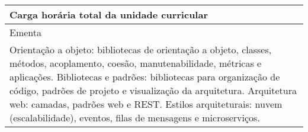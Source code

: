 \begin{quadro}[h!]
\begin{tabular}{|p{3cm} p{2cm} p{3cm} p{2cm} p{3cm} p{2cm}|}
\multicolumn{5}{|p{13cm}|}{\cellcolor{blue1} Carga horária total da unidade curricular} & \multicolumn{1}{p{1cm}|}{\raggedleft 60	}\\\hline
\multicolumn{6}{|p{15cm}|}{\cellcolor{blue1} Ementa} \\\hline
\hline\multicolumn{6}{|p{15cm}|}{\scriptsize Orientação a objeto: bibliotecas de orientação a objeto, classes, métodos, acoplamento, coesão, manutenabilidade, métricas e aplicações. Bibliotecas e padrões: bibliotecas para organização de código, padrões de projeto e visualização da arquitetura. Arquitetura web: camadas, padrões web e REST. Estilos arquiteturais: nuvem (escalabilidade), eventos, filas de mensagens e microserviços. }\\\hline
\hline
	\end{tabular}
\end{quadro}
